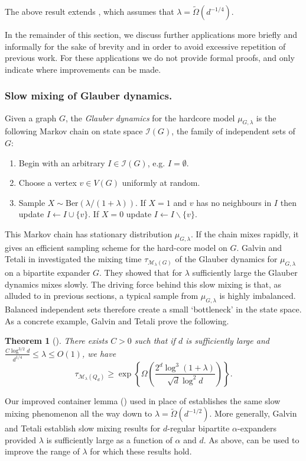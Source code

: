 \documentclass[a4paper]{amsart}
\newtheorem{thm}{Theorem}[section]
\theoremstyle{definition}
\newcommand{\cI}{\mathcal{I} }
\newcommand{\cM}{\mathcal{M} }
\newcommand{\nin}[0]{\noindent}
\newcommand{\0}[0]{\emptyset}
\newcommand{\lam}{\lambda}
\begin{document}
\nin The above result extends \cite[Theorem 2]{jenssen2023approximately}, which assumes that $\lam=\tilde \Omega(d^{-1/4})$. 

In the remainder of this section, we discuss further applications more briefly and informally {for the sake of brevity and in order to avoid excessive} repetition of previous work. For these applications we do not provide formal proofs, and only indicate where improvements can be made.

\subsubsection*{Slow mixing of Glauber dynamics.} Given a graph $G$, the \emph{Glauber dynamics} for the hardcore model $\mu_{G,\lam}$ is the following Markov chain on state space $\cI(G)$, the family of independent sets of $G$:
\begin{enumerate}
\item Begin with an arbitrary $I\in\cI(G)$, e.g. $I=\emptyset$.
\item Choose a vertex $v\in V(G)$ uniformly at random.
\item {Sample} $X\sim \text{Ber}(\lam/(1+\lam))$. If $X=1$ and $v$ has no neighbours in $I$ then update $I\leftarrow I\cup \{v\}$. If $X=0$ update $I\leftarrow I\backslash \{v\}$.
\end{enumerate}
This Markov chain has stationary distribution $\mu_{G,\lam}$. If the chain mixes rapidly, it gives an efficient sampling scheme for the hard-core model on $G$. Galvin and Tetali in \cite{galvin2006slow} investigated the mixing time $\tau_{\cM_{\lam}(G)}$ of the Glauber dynamics for $\mu_{G,\lam}$ on a bipartite expander $G$. They showed that for $\lam$ sufficiently large the Glauber dynamics mixes slowly. The driving force behind this slow mixing is that, as alluded to in previous sections, a typical sample from $\mu_{G,\lam}$ is highly imbalanced. Balanced independent sets therefore create a small `bottleneck' in the state space. As a concrete example, Galvin and Tetali prove the following. 

\begin{thm}[{\cite[Corollary 1.4]{galvin2006slow}}] 
    There exists $C>0$ such that if $d$ is sufficiently large and $\frac{C\log^{3/2} d}{d^{1/4}}\leq \lam\leq O(1)$, we have
    \[ \tau_{\cM_\lam (Q_d)} \geq \exp\left\{\Omega\left(\frac{2^d \log^3(1+\lam)}{\sqrt{d}\log^2 d} \right)\right\}.\]
\end{thm}

Our improved container lemma () used in place of \cite[Theorem 2.1]{galvin2006slow}
establishes the same slow mixing phenomenon all the way down to $\lam=\tilde \Omega(d^{-1/2})$. More generally, Galvin and Tetali establish slow mixing results for $d$-regular bipartite $\alpha$-expanders provided $\lam$ is sufficiently large as a function of $\alpha$ and $d$. As above,  can be used to improve the range of $\lam$ for which these results hold.
\end{document}
